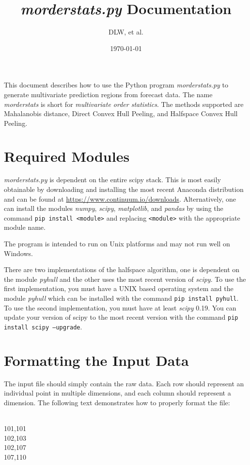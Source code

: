 \documentclass[11pt]{article}
\title{\textit{morderstats.py} Documentation}
\author{DLW, et al.}
\date{\today}
\begin{document}
\maketitle

This document describes how to use the Python program
\textit{morderstats.py} to generate multivariate prediction regions
from forecast data. The name \textit{morderstats} is short for
\textit{multivariate order statistics}. The methods supported are
Mahalanobis distance, Direct Convex Hull Peeling, and Halfspace Convex
Hull Peeling.

\section{Required Modules}

\textit{morderstats.py} is dependent on the entire scipy stack. This is most easily obtainable by downloading and installing the most recent Anaconda distribution and can be found at  \url{https://www.continuum.io/downloads}. Alternatively, one can install the modules \textit{numpy}, \textit{scipy}, \textit{matplotlib}, and \textit{pandas} by using the command \texttt{pip install <module>} and replacing \texttt{<module>} with the appropriate module name. 

The program is intended to run on Unix platforms and may not run well on Windows.

There are two implementations of the halfspace algorithm, one is dependent on the module \textit{pyhull} and the other uses the most recent version of \textit{scipy}. To use the first implementation, you must have a UNIX based operating system and the module \textit{pyhull} which can be installed with the command \texttt{pip install pyhull}. To use the second implementation, you must have at least \textit{scipy} 0.19. You can update your version of scipy to the most recent version with the command \texttt{pip install scipy --upgrade}.

\section{Formatting the Input Data}

The input file should simply contain the raw data. Each row should represent an individual point in multiple dimensions, and each column should represent a dimension. The following text demonstrates how to properly format the file:

\begin{framed}
	\noindent
\\
101,101\\
102,103\\
102,107\\
107,110\\
\end{framed}
\end{document}
